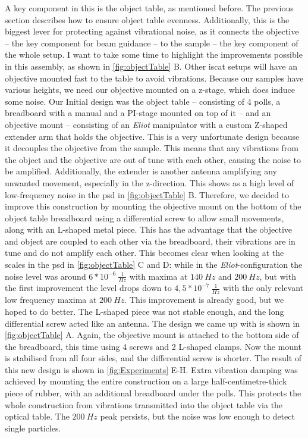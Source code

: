         A key component in this is the object table, as mentioned before. The previous section describes how to ensure object table evenness. Additionally, this is the biggest lever for protecting against vibrational noise, as it connects the objective -- the key component for beam guidance -- to the sample -- the key component of the whole setup. I want to take some time to highlight the improvements possible in this assembly, as shown in \cref{fig:objectTable} B. Other \gls{iscat} setups will have an objective mounted fast to the table to avoid vibrations\cite{ortega2016interferometric}. Because our samples have various heights, we need our objective mounted on a z-stage, which does induce some noise. Our Initial design was the object table -- consisting of 4 polls, a breadboard with a manual and a PI-stage mounted on top of it -- and an objective mount -- consisting of an \textit{Eliot} manipulator with a custom Z-shaped extender arm that holds the objective. This is a very unfortunate design because it decouples the objective from the sample. This means that any vibrations from the object and the objective are out of tune with each other, causing the noise to be amplified. Additionally, the extender is another antenna amplifying any unwanted movement, especially in the z-direction. This shows as a high level of low-frequency noise in the \gls{psd} in \cref{fig:objectTable} B. Therefore, we decided to improve this construction by mounting the objective mount on the bottom of the object table breadboard using a differential screw to allow small movements, along with an L-shaped metal piece. This has the advantage that the objective and object are coupled to each other via the breadboard, their vibrations are in tune and do not amplify each other. This becomes clear when looking at the scales in the \gls{psd} in \cref{fig:objectTable} C and D: while in the \textit{Eliot}-configuration the noise level was around $6*10^{-6}~\frac{1}{Hz}$ with maxima at $140~Hz$ and $200~Hz$, but with the first improvement the level drops down to  $4,5*10^{-7}~\frac{1}{Hz}$ with the only relevant low frequency maxima at $200~Hz$. This improvement is already good, but we hoped to do better. The L-shaped piece was not stable enough, and the long differential screw acted like an antenna. The design we came up with is shown in \cref{fig:objectTable} A. Again, the objective mount is attached to the bottom side of the breadboard, this time using 4 screws and 2 L-shaped clamps. Now the mount is stabilised from all four sides, and the differential screw is shorter. The result of this new design is shown in \cref{fig:Experiments} E-H. Extra vibration damping was achieved by mounting the entire construction on a large half-centimetre-thick piece of rubber, with an additional breadboard under the polls. This protects the whole construction from vibrations transmitted into the object table via the optical table. The $200~Hz$ peak persists, but the noise was low enough to detect single particles.
